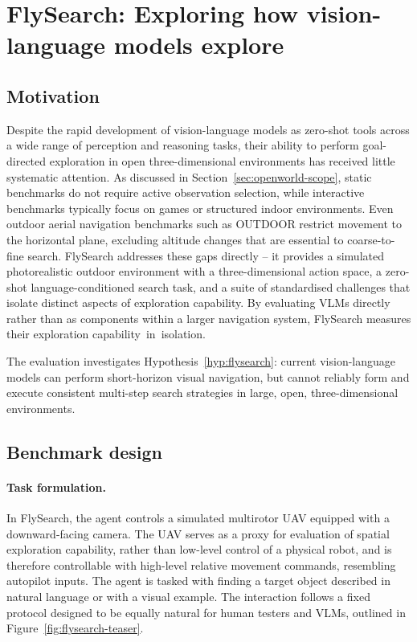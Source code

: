 \newcommand{\flysearch}{FlySearch}
\newcommand{\challenge}{FS-1}
\newcommand{\anomalychallenge}{FS-Anomaly-1}
\newcommand{\hardchallenge}{FS-2}

\section{FlySearch: Exploring how vision-language models explore}
\label{sec:flysearch}

\subsection{Motivation}
\label{sec:flysearch-motivation}

Despite the rapid development of vision-language models as zero-shot tools across a wide range of perception and reasoning tasks, their ability to perform goal-directed exploration in open three-dimensional environments has received little systematic attention. As discussed in Section~\ref{sec:openworld-scope}, static benchmarks do not require active observation selection, while interactive benchmarks typically focus on games or structured indoor environments. Even outdoor aerial navigation benchmarks such as OUTDOOR restrict movement to the horizontal plane, excluding altitude changes that are essential to coarse-to-fine search. FlySearch addresses these gaps directly -- it provides a simulated photorealistic outdoor environment with a three-dimensional action space, a zero-shot language-conditioned search task, and a suite of standardised challenges that isolate distinct aspects of exploration capability. By evaluating VLMs directly rather than as components within a larger navigation system, FlySearch measures their exploration capability~in~isolation.

The evaluation investigates Hypothesis~\ref{hyp:flysearch}: current vision-language models can perform short-horizon visual navigation, but cannot reliably form and execute consistent multi-step search strategies in large, open, three-dimensional environments.

\subsection{Benchmark design}
\label{sec:flysearch-benchmark}

\paragraph{Task formulation.} In \flysearch{}, the agent controls a simulated multirotor UAV equipped with a downward-facing camera. The UAV serves as a proxy for evaluation of spatial exploration capability, rather than low-level control of a physical robot, and is therefore controllable with high-level relative movement commands, resembling autopilot inputs. The agent is tasked with finding a target object described in natural language or with a visual example. The interaction follows a fixed protocol designed to be equally natural for human testers and VLMs, outlined in Figure~\ref{fig:flysearch-teaser}.

